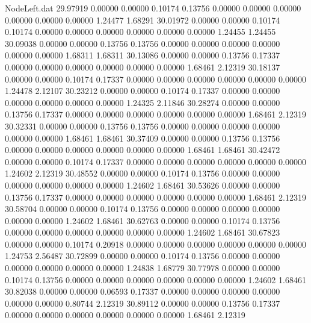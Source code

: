\begin{filecontents}{NodeLeft.dat}
  29.97919    0.00000    0.00000     0.10174    0.13756    0.00000    0.00000    0.00000    0.00000    0.00000    0.00000    1.24477    1.68291
  30.01972    0.00000    0.00000     0.10174    0.10174    0.00000    0.00000    0.00000    0.00000    0.00000    0.00000    1.24455    1.24455
  30.09038    0.00000    0.00000     0.13756    0.13756    0.00000    0.00000    0.00000    0.00000    0.00000    0.00000    1.68311    1.68311
  30.13086    0.00000    0.00000     0.13756    0.17337    0.00000    0.00000    0.00000    0.00000    0.00000    0.00000    1.68461    2.12319
  30.18137    0.00000    0.00000     0.10174    0.17337    0.00000    0.00000    0.00000    0.00000    0.00000    0.00000    1.24478    2.12107
  30.23212    0.00000    0.00000     0.10174    0.17337    0.00000    0.00000    0.00000    0.00000    0.00000    0.00000    1.24325    2.11846
  30.28274    0.00000    0.00000     0.13756    0.17337    0.00000    0.00000    0.00000    0.00000    0.00000    0.00000    1.68461    2.12319
  30.32331    0.00000    0.00000     0.13756    0.13756    0.00000    0.00000    0.00000    0.00000    0.00000    0.00000    1.68461    1.68461
  30.37409    0.00000    0.00000     0.13756    0.13756    0.00000    0.00000    0.00000    0.00000    0.00000    0.00000    1.68461    1.68461
  30.42472    0.00000    0.00000     0.10174    0.17337    0.00000    0.00000    0.00000    0.00000    0.00000    0.00000    1.24602    2.12319
  30.48552    0.00000    0.00000     0.10174    0.13756    0.00000    0.00000    0.00000    0.00000    0.00000    0.00000    1.24602    1.68461
  30.53626    0.00000    0.00000     0.13756    0.17337    0.00000    0.00000    0.00000    0.00000    0.00000    0.00000    1.68461    2.12319
  30.58704    0.00000    0.00000     0.10174    0.13756    0.00000    0.00000    0.00000    0.00000    0.00000    0.00000    1.24602    1.68461
  30.62763    0.00000    0.00000     0.10174    0.13756    0.00000    0.00000    0.00000    0.00000    0.00000    0.00000    1.24602    1.68461
  30.67823    0.00000    0.00000     0.10174    0.20918    0.00000    0.00000    0.00000    0.00000    0.00000    0.00000    1.24753    2.56487
  30.72899    0.00000    0.00000     0.10174    0.13756    0.00000    0.00000    0.00000    0.00000    0.00000    0.00000    1.24838    1.68779
  30.77978    0.00000    0.00000     0.10174    0.13756    0.00000    0.00000    0.00000    0.00000    0.00000    0.00000    1.24602    1.68461
  30.82038    0.00000    0.00000     0.06593    0.17337    0.00000    0.00000    0.00000    0.00000    0.00000    0.00000    0.80744    2.12319
  30.89112    0.00000    0.00000     0.13756    0.17337    0.00000    0.00000    0.00000    0.00000    0.00000    0.00000    1.68461    2.12319

\end{filecontents}
